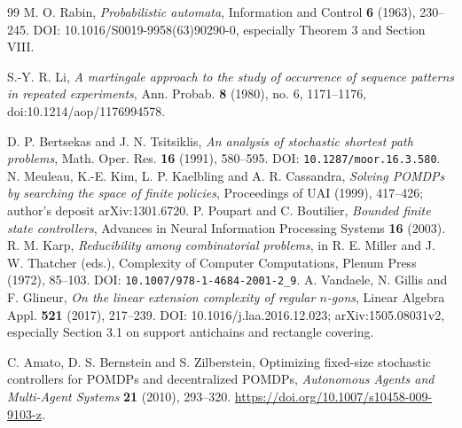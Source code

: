 \begin{thebibliography}{99}
 M. O. Rabin, \emph{Probabilistic automata},
Information and Control \textbf{6} (1963), 230--245.
DOI: 10.1016/S0019-9958(63)90290-0, especially Theorem 3 and Section VIII.

S.-Y. R. Li, \emph{A martingale approach to the study of occurrence of
sequence patterns in repeated experiments}, Ann. Probab. \textbf{8}
(1980), no. 6, 1171--1176, doi:10.1214/aop/1176994578.


 D. P. Bertsekas and J. N. Tsitsiklis,
\emph{An analysis of stochastic shortest path problems},
Math. Oper. Res. \textbf{16} (1991), 580--595.
DOI: \texttt{10.1287/moor.16.3.580}.
 N. Meuleau, K.-E. Kim, L. P. Kaelbling and A. R. Cassandra,
\emph{Solving POMDPs by searching the space of finite policies},
Proceedings of UAI (1999), 417--426; author's deposit arXiv:1301.6720.
 P. Poupart and C. Boutilier,
\emph{Bounded finite state controllers},
Advances in Neural Information Processing Systems \textbf{16} (2003).
 R. M. Karp,
\emph{Reducibility among combinatorial problems},
in R. E. Miller and J. W. Thatcher (eds.), Complexity of Computer
Computations, Plenum Press (1972), 85--103.
DOI: \texttt{10.1007/978-1-4684-2001-2\_9}.
 A. Vandaele, N. Gillis and F. Glineur,
\emph{On the linear extension complexity of regular $n$-gons},
Linear Algebra Appl. \textbf{521} (2017), 217--239.
DOI: 10.1016/j.laa.2016.12.023; arXiv:1505.08031v2,
especially Section 3.1 on support antichains and rectangle covering.

C. Amato, D. S. Bernstein and S. Zilberstein,
Optimizing fixed-size stochastic controllers for POMDPs and decentralized
POMDPs, \emph{Autonomous Agents and Multi-Agent Systems} \textbf{21}
(2010), 293--320. \url{https://doi.org/10.1007/s10458-009-9103-z}.


\end{thebibliography}
